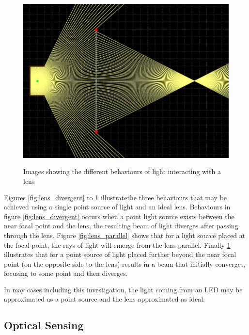 \begin{figure}[H]
\begin{minipage}{.3\textwidth}
		\centering
		\includegraphics[width=.9\linewidth]{figures/litreview/lens_focus_beam.JPG}
		\label{fig:lens_convergent}
	\end{minipage}
	\caption*{Images showing the different behaviours of light interacting with a lens}
\end{figure}

Figures \ref{fig:lens_divergent} to \ref{fig:lens_convergent} illustrate\footnotemark the three behaviours that may be achieved using a single point source of light and an ideal lens. Behaviours in figure \ref{fig:lens_divergent} occurs when a point light source exists between the near focal point and the lens, the resulting beam of light diverges after passing through the lens. Figure \ref{fig:lens_parallel} shows that for a light source placed at the focal point, the rays of light will emerge from the lens parallel. Finally \ref{fig:lens_convergent} illustrates that for a point source of light placed further beyond the near focal point (on the opposite side to the lens) results in a beam that initially converges, focusing to some point and then diverges.

In may cases including this investigation, the light coming from an LED may be approximated as a point source and the lens approximated as ideal.



\subsection{Optical Sensing} %

